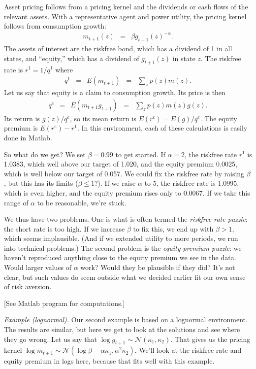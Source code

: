 \documentclass[11pt]{article}
\begin{document}
Asset pricing follows from a pricing kernel and the dividends or cash flows
of the relevant assets.
With a representative agent and power utility, the pricing kernel follows
from consumption growth:
\begin{eqnarray*}
    m_{t+1} (z) &=& \beta g_{t+1}(z)^{-\alpha} .
\end{eqnarray*}
The assets of interest are the riskfree bond, which has a dividend of 1 in all states,
and ``equity,'' which has a dividend of $g_{t+1}(z)$ in state $z$.
The riskfree rate is $r^1 = 1/q^1$ where
\begin{eqnarray*}
    q^1 &=& E (m_{t+1} )  \;\;=\;\; \sum_z p(z) m(z) .
\end{eqnarray*}
Let us say that equity is a claim to consumption growth.
Its price is then
\begin{eqnarray*}
    q^e &=& E (m_{t+1} g_{t+1} )  \;\;=\;\; \sum_z p(z) m(z) g(z) .
\end{eqnarray*}
Its return is $ g(z)/q^e$, so its mean return is $E(r^e) = E (g)/q^e$.
The equity premium is $ E(r^e) - r^1$.
In this environment, each of these calculations is easily done in Matlab.

So what do we get?
We set $\beta = 0.99$ to get started.
If $\alpha = 2$, the riskfree rate $r^1$ is 1.0383, which well above our target of 1.020,
and the equity premium 0.0025, which is well below our target of 0.057.
We could fix the riskfree rate by raising $\beta$,
but this has its limits ($\beta \leq 1$?).
If we raise $\alpha$ to 5, the riskfree rate is 1.0995,
which is even higher,
and the equity premium rises only to 0.0067.
If we take this range of $\alpha$ to be reasonable, we're stuck.

We thus have two problems.
One is what is often termed the {\it riskfree rate puzzle\/}:
the short rate is too high.
If we increase $\beta$ to fix this, we end up with $\beta>1$,
which seems implausible.
(And if we extended utility to more periods, we run into technical problems.)
The second problem is the {\it equity premium puzzle\/}:
we haven't reproduced anything close to the equity premium we see in the data.
Would larger values of $\alpha$ work?  Would they be plausible if they did?
It's not clear, but such values do seem outside what we decided earlier
fit our own sense of risk aversion.

[See Matlab program for computations.]


{\it Example (lognormal).}
Our second example is based on a lognormal environment.
The results are similar, but here we get to look at the solutions
and see where they go wrong.
Let us say that $\log g_{t+1} \sim \mathcal{N}(\kappa_1, \kappa_2)$.
That gives us the pricing kernel
$\log m_{t+1} \sim \mathcal{N}(\log \beta - \alpha \kappa_1, \alpha^2 \kappa_2)$.
We'll look at the riskfree rate and equity premium in logs here,
because that fits well with this example.
\end{document}
